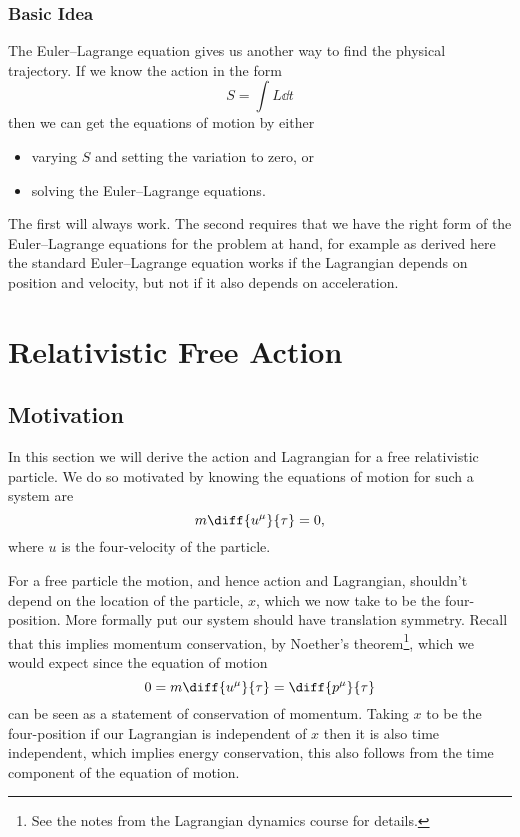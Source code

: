 \documentclass[fleqn]{NotesClass}
\newcommand*{\lagrangian}{L}
\begin{document}
    \subsection{Basic Idea}
    The Euler--Lagrange equation gives us another way to find the physical trajectory.
    If we know the action in the form
    \begin{equation}
        S = \int \lagrangian \dd{t}
    \end{equation}
    then we can get the equations of motion by either
    \begin{itemize}
        \item varying \(S\) and setting the variation to zero, or
        \item solving the Euler--Lagrange equations.
    \end{itemize}
    The first will always work.
    The second requires that we have the right form of the Euler--Lagrange equations for the problem at hand, for example as derived here the standard Euler--Lagrange equation works if the Lagrangian depends on position and velocity, but not if it also depends on acceleration.
    
    \chapter{Relativistic Free Action}
    \section{Motivation}
    In this section we will derive the action and Lagrangian for a free relativistic particle.
    We do so motivated by knowing the equations of motion for such a system are
    \begin{equation}
        m\diff{u^\mu}{\tau} = 0,
    \end{equation}
    where \(u\) is the four-velocity of the particle.
    
    For a free particle the motion, and hence action and Lagrangian, shouldn't depend on the location of the particle, \(x\), which we now take to be the four-position.
    More formally put our system should have translation symmetry.
    Recall that this implies momentum conservation, by Noether's theorem\footnote{See the notes from the Lagrangian dynamics course for details.}, which we would expect since the equation of motion
    \begin{equation}
        0 = m\diff{u^\mu}{\tau} = \diff{p^\mu}{\tau}
    \end{equation}
    can be seen as a statement of conservation of momentum.
    Taking \(x\) to be the four-position if our Lagrangian is independent of \(x\) then it is also time independent, which implies energy conservation, this also follows from the time component of the equation of motion.
    
\end{document}
